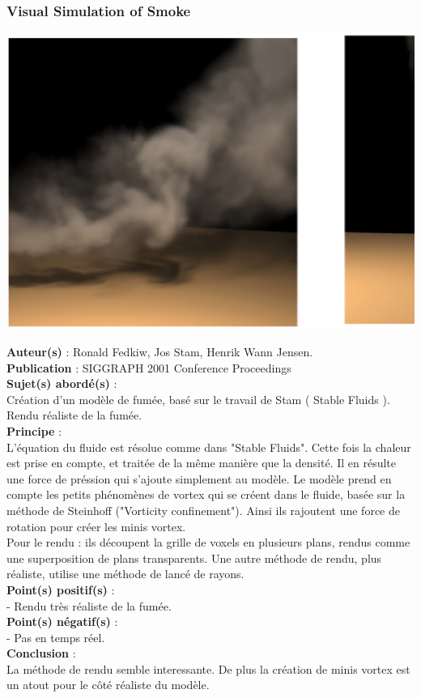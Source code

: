\documentclass[a4paper,10pt]{article}
\begin{document}
\subsubsection{Visual Simulation of Smoke}
    \begin{center}
	\includegraphics[scale=0.3]{Smoke.ps}
    \end{center}
\textbf{Auteur(s)} : Ronald Fedkiw, Jos Stam, Henrik Wann Jensen.\\
\textbf{Publication} : SIGGRAPH 2001 Conference Proceedings \\
\textbf{Sujet(s) abordé(s)} : \\
	Création d'un modèle de fumée, basé sur le travail de Stam ( Stable Fluids ).\\
	Rendu réaliste de la fumée.\\
\textbf{Principe} :\\	
	L'équation du fluide est résolue comme dans "Stable Fluids". Cette fois la chaleur est prise en compte, et traitée de la même manière que la densité. Il en résulte une force de préssion qui s'ajoute simplement au modèle. Le modèle prend en compte les petits phénomènes de vortex qui se créent dans le fluide, basée sur la méthode de Steinhoff ("Vorticity confinement"). Ainsi ils rajoutent une force de rotation pour créer les minis vortex.\\
Pour le rendu : ils découpent la grille de voxels en plusieurs plans, rendus comme une superposition de plans transparents.
Une autre méthode de rendu, plus réaliste, utilise une méthode de lancé de rayons.\\
\textbf{Point(s) positif(s)} :\\
	- Rendu très réaliste de la fumée.\\
\textbf{Point(s) négatif(s)} :\\
	- Pas en temps réel.\\
\textbf{Conclusion} :\\
	La méthode de rendu semble interessante. De plus la création de minis vortex est un atout pour le côté réaliste du modèle.
	
\end{document}

